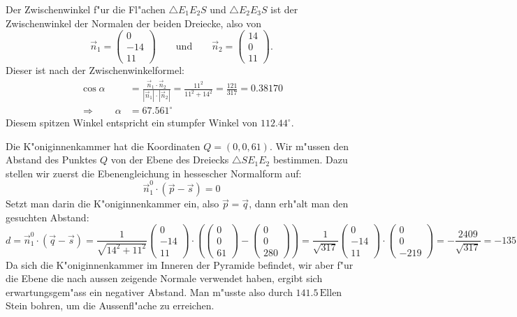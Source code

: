\begin{loesung}
\begin{teilaufgaben}
\item
Der Zwischenwinkel f"ur die Fl"achen $\triangle E_1E_2S$ und
$\triangle E_2E_3S$ ist der Zwischenwinkel der Normalen der beiden
Dreiecke, also von
\[
\vec n_1
=
\begin{pmatrix} 0\\-14\\11 \end{pmatrix}
\qquad\text{und}\qquad
\vec n_2
=
\begin{pmatrix} 14\\0\\11 \end{pmatrix}.
\]
Dieser ist nach der Zwischenwinkelformel:
\begin{align*}
\cos\alpha
&=
\frac{\vec n_1\cdot \vec n_2}{|\vec n_1|\cdot|\vec n_2|}
=
\frac{11^2}{11^2+14^2}=\frac{121}{317}=0.38170
\\
\Rightarrow\qquad
\alpha
&=
67.561^\circ
\end{align*}
Diesem spitzen Winkel entspricht ein stumpfer Winkel von $112.44^\circ$.
\item
Die K"oniginnenkammer hat die Koordinaten $Q=(0,0,61)$.
Wir m"ussen den Abstand des Punktes $Q$ von der Ebene des Dreiecks
$\triangle SE_1E_2$ bestimmen.
Dazu stellen wir zuerst die Ebenengleichung in hessescher Normalform
auf:
\[
\vec n_1^0 \cdot (\vec p-\vec s)=0
\]
Setzt man darin die K"oniginnenkammer ein,  also $\vec p=\vec q$, dann
erh"alt man den gesuchten Abstand:
\[
d
=
\vec n_1^0 \cdot (\vec q-\vec s)
=
\frac1{\sqrt{14^2+11^2}}
\begin{pmatrix}0\\-14\\11 \end{pmatrix}
\cdot
\left(
\begin{pmatrix}0\\0\\61\end{pmatrix}
-
\begin{pmatrix}0\\0\\280\end{pmatrix}
\right)
=
\frac1{\sqrt{317}}
\begin{pmatrix}0\\-14\\11 \end{pmatrix}
\cdot
\begin{pmatrix}0\\0\\-219\end{pmatrix}
=
-\frac{2409}{\sqrt{317}}=-135.30
\]
Da sich die K"oniginnenkammer im Inneren der Pyramide befindet, wir aber
f"ur die Ebene die nach aussen zeigende Normale verwendet haben, ergibt
sich erwartungsgem"ass ein negativer Abstand.
Man m"usste also durch $141.5\,\text{Ellen}$ Stein bohren, um die Aussenfl"ache
zu erreichen.
\qedhere
\end{teilaufgaben}
\end{loesung}

